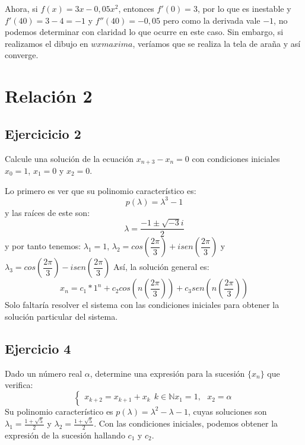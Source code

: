 \documentclass[11pt, a4paper]{article}
\newif\IfInSansMode
\numberwithin{equation}{section}
\theoremstyle{theorem-style}
\theoremstyle{definition-style}
\theoremstyle{remark-style}
\theoremstyle{example-style}
\begin{document}
    Ahora, si $f(x) = 3x - 0,05x^2$, entonces $f'(0) = 3$, por lo que es inestable y $f'(40) =3-4 = -1$ y $f''(40) = -0,05$
    pero como la derivada vale $-1$, no podemos determinar con claridad lo que ocurre en este caso. Sin embargo, si realizamos el dibujo en $wxmaxima$, veríamos que se realiza la tela de araña y así converge.




    \section{Relación 2}

    \subsection{Ejercicicio 2}
    Calcule una solución de la ecuación $x_ {n+3} -x_n = 0$ con condiciones iniciales $x_0 = 1$, $x_1 = 0$ y $x_2 = 0$.

    Lo primero es ver que su polinomio característico es:
    \[
        p(\lambda) = \lambda^3 -1
    \]
    y las raíces de este son:
    \[
        \lambda = \frac{-1 \pm \sqrt{-3}i}{2}
    \]
    y por tanto tenemos: $\lambda_1 = 1$, $\lambda_2 = cos(\dfrac{2\pi}{3})+ i sen(\dfrac{2\pi}{3})$ y $\lambda_3 = cos(\dfrac{2\pi}{3}) - i sen(\dfrac{2\pi}{3})$
    Así, la solución general es:
    \[
        x_n = c_1 * 1^n + c_2 cos(n(\dfrac{2\pi}{3})) + c_3 sen(n(\dfrac{2\pi}{3}))
    \]
    Solo faltaría resolver el sistema con las condiciones iniciales para obtener la solución particular del sistema.


    \subsection{Ejercicio 4}
    Dado un número real $\alpha$, determine una expresión para la sucesión $\{x_n\}$ que verifica:
    \[
        \begin{cases}
            x_{k+2} = x _{k+1} + x_k \ \ k \in \mathbb N
            x_1 = 1, \ \ \ x_2 = \alpha
        \end{cases}
    \]
    Su polinomio característico es $p(\lambda) = \lambda^2 - \lambda - 1$, cuyas soluciones son $\lambda_1 = \frac{1+\sqrt 5}{2}$ y $\lambda_2 = \frac{1+ \sqrt 5}{2}$. Con las condiciones iniciales, podemos obtener la expresión de la sucesión hallando $c_1$ y $c_2$.
\end{document}
